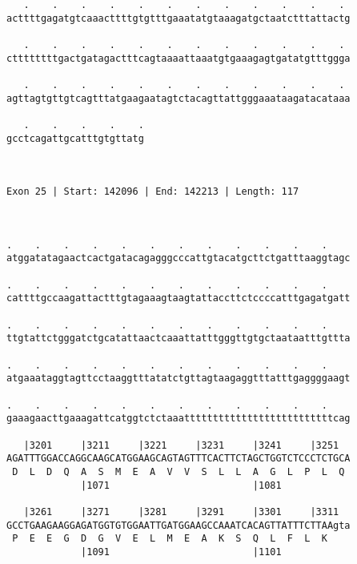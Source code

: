 \documentclass{article}
\begin{document}
\begin{Verbatim}
   .    .    .    .    .    .    .    .    .    .    .    . 
acttttgagatgtcaaacttttgtgtttgaaatatgtaaagatgctaatctttattactg
                                                            
   .    .    .    .    .    .    .    .    .    .    .    . 
cttttttttgactgatagactttcagtaaaattaaatgtgaaagagtgatatgtttggga
                                                            
   .    .    .    .    .    .    .    .    .    .    .    . 
agttagtgttgtcagtttatgaagaatagtctacagttattgggaaataagatacataaa
                                                            
   .    .    .    .    .
gcctcagattgcatttgtgttatg
                        
                        
 
Exon 25 | Start: 142096 | End: 142213 | Length: 117



.    .    .    .    .    .    .    .    .    .    .    .    
atggatatagaactcactgatacagagggcccattgtacatgcttctgatttaaggtagc
                                                            
.    .    .    .    .    .    .    .    .    .    .    .    
cattttgccaagattactttgtagaaagtaagtattaccttctccccatttgagatgatt
                                                            
.    .    .    .    .    .    .    .    .    .    .    .    
ttgtattctgggatctgcatattaactcaaattatttgggttgtgctaataatttgttta
                                                            
.    .    .    .    .    .    .    .    .    .    .    .    
atgaaataggtagttcctaaggtttatatctgttagtaagaggtttatttgaggggaagt
                                                            
.    .    .    .    .    .    .    .    .    .    .    .    
gaaagaacttgaaagattcatggtctctaaattttttttttttttttttttttttttcag
                                                            
   |3201     |3211     |3221     |3231     |3241     |3251  
AGATTTGGACCAGGCAAGCATGGAAGCAGTAGTTTCACTTCTAGCTGGTCTCCCTCTGCA
 D  L  D  Q  A  S  M  E  A  V  V  S  L  L  A  G  L  P  L  Q 
             |1071                         |1081            
  
   |3261     |3271     |3281     |3291     |3301     |3311  
GCCTGAAGAAGGAGATGGTGTGGAATTGATGGAAGCCAAATCACAGTTATTTCTTAAgta
 P  E  E  G  D  G  V  E  L  M  E  A  K  S  Q  L  F  L  K    
             |1091                         |1101            
  

\end{Verbatim}
\end{document}
